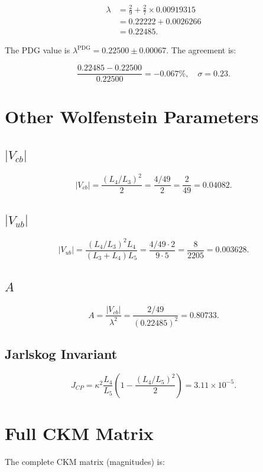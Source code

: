 \[
\begin{aligned}
\lambda &= \frac{2}{9} + \frac{2}{7} \times 0.00919315 \\
        &= 0.22222 + 0.0026266 \\
        &= 0.22485.
\end{aligned}
\]

The PDG value is \(\lambda^{\text{PDG}} = 0.22500 \pm 0.00067\).
The agreement is:

\[
\frac{0.22485 - 0.22500}{0.22500} = -0.067\%,\quad \sigma = 0.23.
\]

\section{Other Wolfenstein Parameters}

\subsection{\(|V_{cb}|\)}

\[
|V_{cb}| = \frac{(L_4/L_3)^2}{2} = \frac{4/49}{2} = \frac{2}{49} = 0.04082.
\]

\subsection{\(|V_{ub}|\)}

\[
|V_{ub}| = \frac{(L_4/L_3)^2 L_4}{(L_3+L_4)L_5}
         = \frac{4/49 \cdot 2}{9 \cdot 5}
         = \frac{8}{2205}
         = 0.003628.
\]

\subsection{\(A\)}

\[
A = \frac{|V_{cb}|}{\lambda^2}
  = \frac{2/49}{(0.22485)^2}
  = 0.80733.
\]

\subsection{Jarlskog Invariant}

\[
J_{CP} = \kappa^2 \frac{L_4}{L_5}
         \left(1 - \frac{(L_4/L_5)^2}{2}\right)
       = 3.11 \times 10^{-5}.
\label{eq:jcp}
\]

\section{Full CKM Matrix}

The complete CKM matrix (magnitudes) is:

